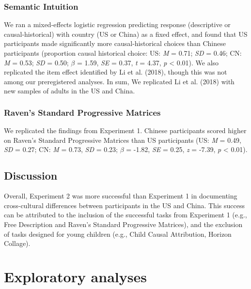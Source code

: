 \documentclass[
  man,floatsintext]{apa6}
\begin{document}
\hypertarget{semantic-intuition-1}{%
\subsubsection{Semantic Intuition}\label{semantic-intuition-1}}

We ran a mixed-effects logistic regression predicting response (descriptive or causal-historical) with country (US or China) as a fixed effect, and found that US participants made significantly more causal-historical choices than Chinese participants (proportion causal historical choice: US: \emph{M} = 0.71; \emph{SD} = 0.46; CN: \emph{M} = 0.53; \emph{SD} = 0.50; \(\beta\) = 1.59, \emph{SE} = 0.37, \emph{t} = 4.37, \emph{p} \textless{} 0.01). We also replicated the item effect identified by Li et al. (2018), though this was not among our preregistered analyses. In sum, We replicated Li et al. (2018) with new samples of adults in the US and China.

\hypertarget{ravens-standard-progressive-matrices-2}{%
\subsubsection{Raven's Standard Progressive Matrices}\label{ravens-standard-progressive-matrices-2}}

We replicated the findings from Experiment 1. Chinese participants scored higher on Raven's Standard Progressive Matrices than US participants (US: \emph{M} = 0.49, \emph{SD} = 0.27; CN: \emph{M} = 0.73, \emph{SD} = 0.23; \(\beta\) = -1.82, \emph{SE} = 0.25, \emph{z} = -7.39, \emph{p} \textless{} 0.01).

\hypertarget{discussion-1}{%
\subsection{Discussion}\label{discussion-1}}

Overall, Experiment 2 was more successful than Experiment 1 in documenting cross-cultural differences between participants in the US and China. This success can be attributed to the inclusion of the successful tasks from Experiment 1 (e.g., Free Description and Raven's Standard Progressive Matrices), and the exclusion of tasks designed for young children (e.g., Child Causal Attribution, Horizon Collage).

\hypertarget{exploratory-analyses}{%
\section{Exploratory analyses}\label{exploratory-analyses}}
\end{document}

